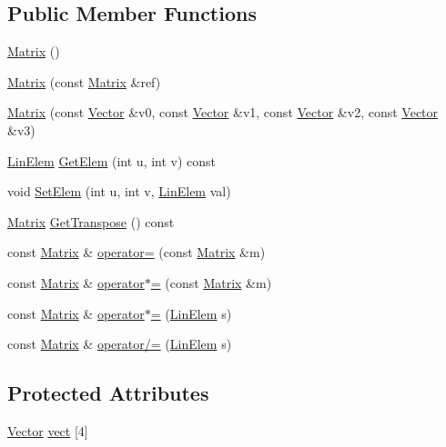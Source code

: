 \subsection*{Public Member Functions}
\begin{DoxyCompactItemize}
\item 
\hyperlink{a00111_a2dba13c45127354c9f75ef576f49269b}{Matrix} ()
\item 
\hyperlink{a00111_a8f8b82a2c3ecce8abef29825a10bac3c}{Matrix} (const \hyperlink{a00111}{Matrix} \&ref)
\item 
\hyperlink{a00111_add074e4a8747e0d200f0b995f88540b3}{Matrix} (const \hyperlink{a00152}{Vector} \&v0, const \hyperlink{a00152}{Vector} \&v1, const \hyperlink{a00152}{Vector} \&v2, const \hyperlink{a00152}{Vector} \&v3)
\item 
\hyperlink{a00234_a4f6e9fb2a8330a392e7819d1aef8881a}{Lin\-Elem} \hyperlink{a00111_a98767142398792a78d85354baf304df2}{Get\-Elem} (int u, int v) const 
\item 
void \hyperlink{a00111_aadf4cb194eda0cca3165c8333faae7c3}{Set\-Elem} (int u, int v, \hyperlink{a00234_a4f6e9fb2a8330a392e7819d1aef8881a}{Lin\-Elem} val)
\item 
\hyperlink{a00111}{Matrix} \hyperlink{a00111_aabcd3f2fc01a018b7345f9c6057700bb}{Get\-Transpose} () const 
\item 
const \hyperlink{a00111}{Matrix} \& \hyperlink{a00111_a05c58b0ce196fde4a04566ef9a72e48d}{operator=} (const \hyperlink{a00111}{Matrix} \&m)
\item 
const \hyperlink{a00111}{Matrix} \& \hyperlink{a00111_a1247ea71eb5795380329bf342aed269a}{operator$\ast$=} (const \hyperlink{a00111}{Matrix} \&m)
\item 
const \hyperlink{a00111}{Matrix} \& \hyperlink{a00111_a5d2cf9accafcf6bcb7a36f93216fb83f}{operator$\ast$=} (\hyperlink{a00234_a4f6e9fb2a8330a392e7819d1aef8881a}{Lin\-Elem} s)
\item 
const \hyperlink{a00111}{Matrix} \& \hyperlink{a00111_a6e0493e673e4d2ce5adfd0d7a235778d}{operator/=} (\hyperlink{a00234_a4f6e9fb2a8330a392e7819d1aef8881a}{Lin\-Elem} s)
\end{DoxyCompactItemize}
\subsection*{Protected Attributes}
\begin{DoxyCompactItemize}
\item 
\hyperlink{a00152}{Vector} \hyperlink{a00111_a592df8aac03c08c05cf3eec187ad0b59}{vect} \mbox{[}4\mbox{]}
\end{DoxyCompactItemize}
